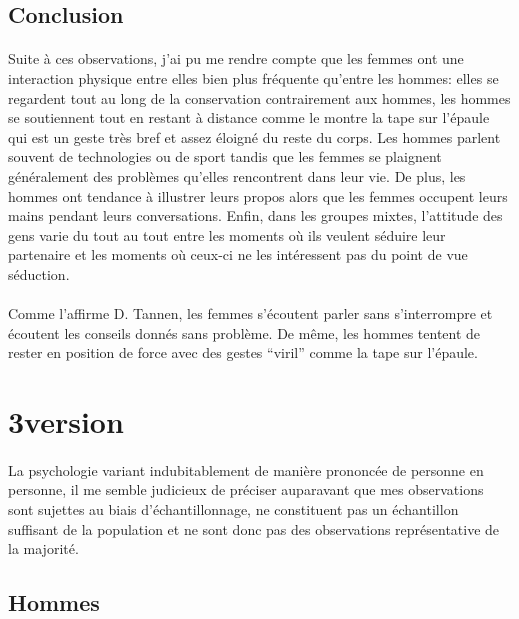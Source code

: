 \subsection{Conclusion}

\paragraph{} Suite à ces observations, j'ai pu me rendre compte que les femmes
ont une interaction physique entre elles bien plus fréquente qu'entre les
hommes: elles se regardent tout au long de la conservation contrairement aux
hommes, les hommes se soutiennent tout en restant à distance comme le montre la
tape sur l'épaule qui est un geste très bref et assez éloigné du reste du
corps. Les hommes parlent souvent de technologies ou de sport tandis que les
femmes se plaignent généralement des problèmes qu'elles rencontrent dans leur
vie. De plus, les hommes ont tendance à illustrer leurs propos alors que les
femmes occupent leurs mains pendant leurs conversations. Enfin, dans les
groupes mixtes, l'attitude des gens varie du tout au tout entre les moments où
ils veulent séduire leur partenaire et les moments où ceux-ci ne les
intéressent pas du point de vue séduction.

\paragraph{} Comme l'affirme D. Tannen, les femmes s'écoutent parler sans
s'interrompre et écoutent les conseils donnés sans problème. De même, les
hommes tentent de rester en position de force avec des gestes ``viril'' comme
la tape sur l'épaule.

\section{3\ieme version}

\paragraph{} La psychologie variant indubitablement de manière prononcée de
personne en personne, il me semble judicieux de préciser auparavant que mes
observations sont sujettes au biais d'échantillonnage, ne constituent pas un
échantillon suffisant de la population et ne sont donc pas des observations
représentative de la majorité.

\subsection{Hommes}

